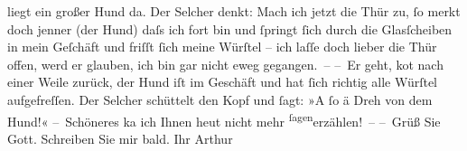 \begin{ledgroupsized}[t]{13cm}
               liegt ein großer Hund da. Der Selcher denkt: Mach ich jetzt die Thür zu, ſo merkt
               doch jenner (der Hund) daſs {\pb}ich fort bin und ſpringt
               ſich durch die Glasſcheiben in mein Geſchäft und friſſt ſich meine Würſtel – ich
               laſſe doch lieber die Thür offen, werd er glauben, ich bin gar nicht eweg
               gegangen. –\pend
           \pstart
           – Er geht, ko{\geminationm}t nach einer Weile zurück, der Hund iſt im
               Geschäft und hat ſich richtig alle Würſtel aufgefreſſen. Der Selcher schüttelt {\pb}den Kopf und ſagt: »A ſo ä Dreh von dem Hund!«\pend
           \pstart
           – Schöneres ka{\geminationn} ich Ihnen heut nicht mehr \substVorne{}\textsuperscript{ſagen}\substDazwischen{}erzählen\substHinten{}! –\pend
           \pstart
           – Grüß Sie Gott. Schreiben Sie mir bald.\pend
           \pstart Ihr \spacefill\mbox{Arthur}\pend{}
         
         \endnumbering{}\end{ledgroupsized}  \newcommand{\dateiname}{L00921}\newcommand{\titel}{Arthur Schnitzler an Richard Beer-Hofmann, 1. 6. 1899}\newcommand{\editorInnen}{Martin Anton Müller und Gerd-Hermann Susen}
      